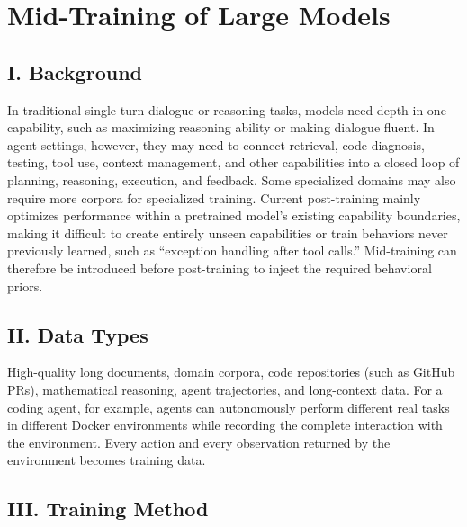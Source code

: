 \setcounter{section}{3}

\hypertarget{mid-training-of-large-models}{%
\section{Mid-Training of Large Models}\label{mid-training-of-large-models}}

\hypertarget{i.-background-5}{%
\subsection{I. Background}\label{i.-background-5}}

In traditional single-turn dialogue or reasoning tasks, models need depth in one capability, such as maximizing reasoning ability or making dialogue fluent. In agent settings, however, they may need to connect retrieval, code diagnosis, testing, tool use, context management, and other capabilities into a closed loop of planning, reasoning, execution, and feedback. Some specialized domains may also require more corpora for specialized training. Current post-training mainly optimizes performance within a pretrained model's existing capability boundaries, making it difficult to create entirely unseen capabilities or train behaviors never previously learned, such as ``exception handling after tool calls.'' Mid-training can therefore be introduced before post-training to inject the required behavioral priors.

\hypertarget{ii.-data-types}{%
\subsection{II. Data Types}\label{ii.-data-types}}

High-quality long documents, domain corpora, code repositories (such as GitHub PRs), mathematical reasoning, agent trajectories, and long-context data. For a coding agent, for example, agents can autonomously perform different real tasks in different Docker environments while recording the complete interaction with the environment. Every action and every observation returned by the environment becomes training data.

\hypertarget{iii.-training-method}{%
\subsection{III. Training Method}\label{iii.-training-method}}

